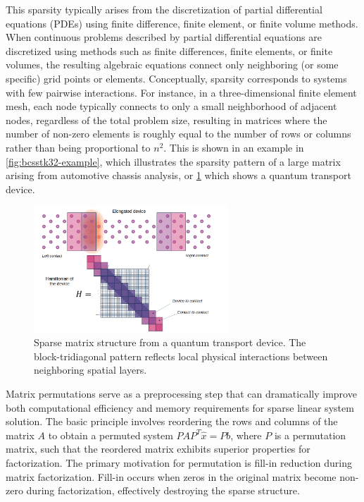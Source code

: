  This sparsity typically arises from the discretization of partial differential equations (PDEs) using finite difference, finite element, or finite volume methods. When continuous problems described by partial differential equations are discretized using methods such as finite differences, finite elements, or finite volumes, the resulting algebraic equations connect only neighboring (or some specific) grid points or elements. Conceptually, sparsity corresponds to systems with few pairwise interactions. For instance, in a three-dimensional finite element mesh, each node typically connects to only a small neighborhood of adjacent nodes, regardless of the total problem size, resulting in matrices where the number of non-zero elements is roughly equal to the number of rows or columns rather than being proportional to $n^2$. This is shown in an example in \cref{fig:bcsstk32-example}, which illustrates the sparsity pattern of a large matrix arising from automotive chassis analysis, or \cref{fig:sparse-matrix-example} which shows a quantum transport device.

\begin{figure}[!h]
    \centering
    \includegraphics[width=0.65\textwidth]{fig/intro/matrix.png}
    \caption{Sparse matrix structure from a quantum transport device. The block-tridiagonal pattern reflects local physical interactions between neighboring spatial layers.}
    \label{fig:sparse-matrix-example}
\end{figure}


Matrix permutations serve as a preprocessing step that can dramatically improve both computational efficiency and memory requirements for sparse linear system solution. The basic principle involves reordering the rows and columns of the matrix $A$ to obtain a permuted system $PAP^T \hat{x} = Pb$, where $P$ is a permutation matrix, such that the reordered matrix exhibits superior properties for factorization. The primary motivation for permutation is fill-in reduction during matrix factorization. Fill-in occurs when zeros in the original matrix become non-zero during factorization, effectively destroying the sparse structure.

